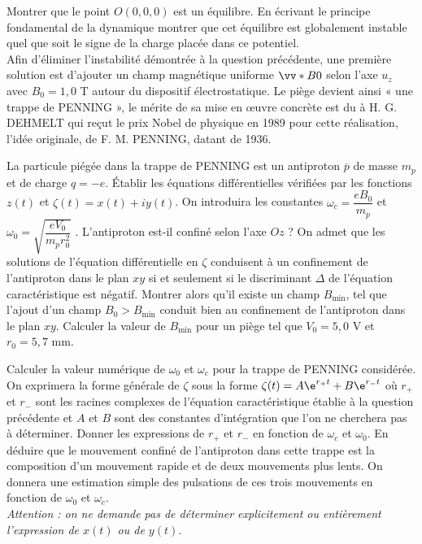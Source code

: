\documentclass[12pt,french,twoside]{exam}
\begin{document}
\begin{questions}
\item Montrer que le point $O(0,0,0)$ est un équilibre. En écrivant le principe fondamental de la dynamique montrer que cet équilibre est globalement instable quel que soit le signe de la charge placée dans ce potentiel.\\

Afin d’éliminer l’instabilité démontrée à la question précédente, une première solution est d’ajouter un champ magnétique uniforme $\vv*{B}{0}$ selon l'axe $\widehat{u_z}$ avec $B_0 = 1,0$ T autour du dispositif électrostatique. Le piège devient ainsi « une trappe de PENNING », le mérite de sa mise en \oe uvre concrète est du à H. G. DEHMELT qui reçut le prix Nobel de physique en 1989 pour cette réalisation, l’idée originale, de F. M. PENNING, datant de 1936.\\ 

\item La particule piégée dans la trappe de PENNING est un antiproton $\overline{p}$ de masse $m_p$ et de charge $q = -e$. Établir les équations différentielles vérifiées par les fonctions $z(t)$ et $\zeta(t) = x(t) + iy(t)$. On introduira les constantes $\omega_c=\dfrac{eB_0}{m_p}$  et $\omega_0=\sqrt{\dfrac{eV_0}{m_pr_0^2}}$ . L'antiproton est-il confiné selon l'axe $Oz$ ? On admet que les solutions de l'équation différentielle en $\zeta$ conduisent à un confinement de l'antiproton dans le plan $xy$ si et seulement si le discriminant $\Delta$ de l'équation caractéristique est négatif. Montrer alors qu’il existe un champ $B_{\text{min}}$, tel que l’ajout d’un champ $B_0 > B_{\text{min}}$ conduit bien au confinement de l’antiproton dans le plan $xy$. Calculer la valeur de $B_{\text{min}}$ pour un piège tel que $V_0 = 5,0$ V et $r_0 = 5,7$ mm.

\item Calculer la valeur numérique de $\omega_0$ et $\omega_c$ pour la trappe de PENNING considérée. On exprimera la forme générale de $\zeta$ sous la forme $\zeta(t) = A\e^{r_+t} + B\e^{r_-t}$ où $r_+$ et $r_-$ sont les racines complexes de l'équation caractéristique établie à la question précédente et $A$ et $B$ sont des constantes d'intégration que l'on ne cherchera pas à déterminer. Donner les expressions de $r_+$ et $r_-$ en fonction de $\omega_c$ et $\omega_0$. En déduire que le mouvement confiné de l’antiproton dans cette trappe est la composition d’un mouvement rapide et de deux mouvements plus lents. On donnera une estimation simple des pulsations de ces trois mouvements en fonction de $\omega_0$ et $\omega_c$. \\ 
\textit{Attention : on ne demande pas de déterminer explicitement ou entièrement l'expression de $x(t)$ ou de $y(t)$. }\\



\end{questions}
\end{document}
